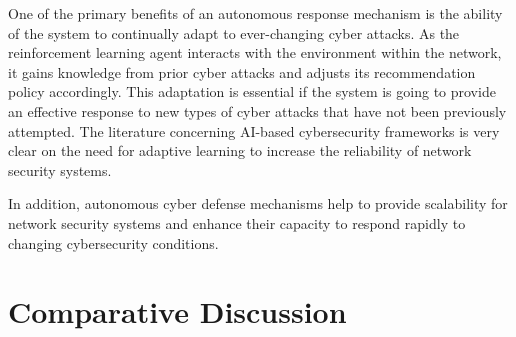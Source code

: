 \documentclass[12pt]{article}
\begin{document}
One of the primary benefits of an autonomous response mechanism is the ability of the system to continually adapt to ever-changing cyber attacks. As the reinforcement learning agent interacts with the environment within the network, it gains knowledge from prior cyber attacks and adjusts its recommendation policy accordingly. This adaptation is essential if the system is going to provide an effective response to new types of cyber attacks that have not been previously attempted. The literature concerning AI-based cybersecurity frameworks is very clear on the need for adaptive learning to increase the reliability of network security systems.

In addition, autonomous cyber defense mechanisms help to provide scalability for network security systems and enhance their capacity to respond rapidly to changing cybersecurity conditions.\cite{Alnfiai2025,Li2024,Ogenyi2025}
	

	\section{Comparative Discussion}
\end{document}
